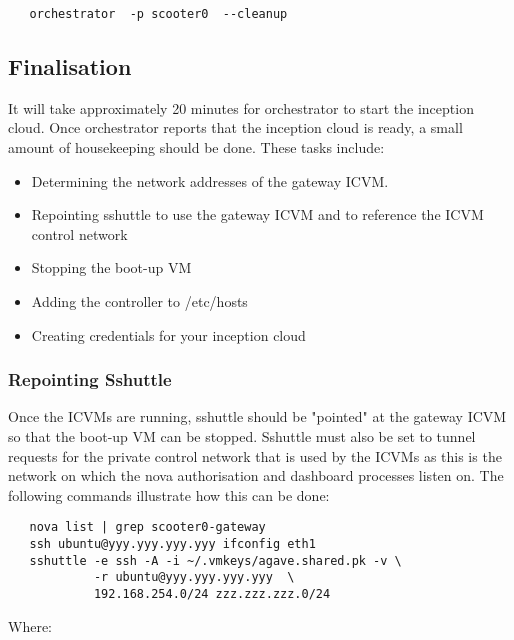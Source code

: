 \small\begin{verbatim}
   orchestrator  -p scooter0  --cleanup
\end{verbatim}\normalsize

\subsection{Finalisation}
It will take approximately 20 minutes for orchestrator to start the inception cloud.
Once orchestrator reports that the inception cloud is ready, a small amount of housekeeping should be done.
These tasks include:

\begin{itemize}
\item Determining the network addresses of the gateway ICVM.

\item Repointing sshuttle to use the gateway ICVM and to reference the ICVM control network

\item Stopping the boot-up VM

\item Adding the controller to /etc/hosts

\item Creating credentials for your inception cloud
\end{itemize}

\subsubsection{Repointing Sshuttle}
Once the ICVMs are running, sshuttle should be "pointed" at the gateway ICVM so that the boot-up VM can be stopped.
Sshuttle must also be set to tunnel requests for the private control network that is used by the
ICVMs as this is the network on which the nova authorisation and dashboard processes listen on.
The following commands illustrate how this can be done:

\small\begin{verbatim}
   nova list | grep scooter0-gateway
   ssh ubuntu@yyy.yyy.yyy.yyy ifconfig eth1
   sshuttle -e ssh -A -i ~/.vmkeys/agave.shared.pk -v \
            -r ubuntu@yyy.yyy.yyy.yyy  \
            192.168.254.0/24 zzz.zzz.zzz.0/24

\end{verbatim}\normalsize
\noindent
Where:

\dlbeg{0.9in}

